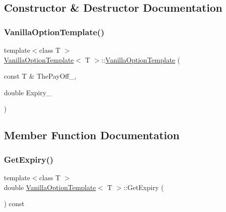 \subsection{Constructor \& Destructor Documentation}
\hypertarget{classVanillaOptionTemplate_aa9e647d7387fa1c176bead8453bb5306}{}\label{classVanillaOptionTemplate_aa9e647d7387fa1c176bead8453bb5306} 
\subsubsection{\texorpdfstring{Vanilla\+Option\+Template()}{VanillaOptionTemplate()}}
{\footnotesize\ttfamily template$<$class T $>$ \\
\hyperlink{classVanillaOptionTemplate}{Vanilla\+Option\+Template}$<$ T $>$\+::\hyperlink{classVanillaOptionTemplate}{Vanilla\+Option\+Template} (\begin{DoxyParamCaption}\item[{const T \&}]{The\+Pay\+Off\+\_\+,  }\item[{double}]{Expiry\+\_\+ }\end{DoxyParamCaption})}



\subsection{Member Function Documentation}
\hypertarget{classVanillaOptionTemplate_aab07d3a8f5a04c637711ce5b1455d8c7}{}\label{classVanillaOptionTemplate_aab07d3a8f5a04c637711ce5b1455d8c7} 
\subsubsection{\texorpdfstring{Get\+Expiry()}{GetExpiry()}}
{\footnotesize\ttfamily template$<$class T $>$ \\
double \hyperlink{classVanillaOptionTemplate}{Vanilla\+Option\+Template}$<$ T $>$\+::Get\+Expiry (\begin{DoxyParamCaption}{ }\end{DoxyParamCaption}) const}

\hypertarget{classVanillaOptionTemplate_a55cddd46a88edc4cde4055e21a627293}{}\label{classVanillaOptionTemplate_a55cddd46a88edc4cde4055e21a627293} 
